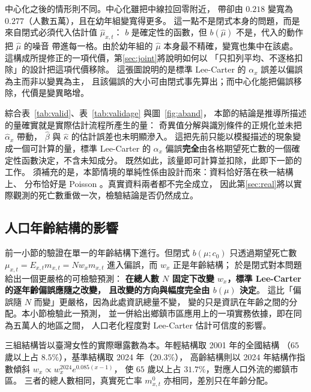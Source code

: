 \documentclass[UTF8, fontset=macnew, a4paper, 12pt]{ctexart}
\begin{document}
中心化之後的情形則不同。中心化雖把中線拉回零附近，
帶卻由 $0.218$ 變寬為 $0.277$（人數五萬），且在幼年組變寬得更多。
這一點不是閉式本身的問題，而是來自閉式必須代入估計值 $\hat\mu_{x,t}$：
$b$ 是確定性的函數，但 $b(\hat\mu)$ 不是，代入的動作把 $\hat\mu$ 的噪音
帶進每一格。由於幼年組的 $\hat\mu$ 本身最不精確，變寬也集中在該處。
這構成所提修正的一項代價，第\ref{sec:joint}將說明如何以
「只扣列平均、不逐格扣除」的設計把這項代價移除。
這張圖說明的是標準 Lee-Carter 的 $\alpha_x$ 誤差以偏誤為主而非以變異為主，
且該偏誤的大小可由閉式事先算出；而中心化能把偏誤移除，代價是變異略增。

綜合表~\ref{tab:valid}、表~\ref{tab:validage} 與圖~\ref{fig:aband}，
本節的結論是推導所描述的量確實就是實際估計流程所產生的量：
奇異值分解與識別條件的正規化並未把 $\hat\alpha_x$ 帶動，
$\hat\beta$ 與 $\hat\kappa$ 的估計誤差也未明顯滲入。
這把先前只能以模擬描述的現象變成一個可計算的量，標準 Lee-Carter 的 $\alpha_x$
偏誤\textbf{完全}由各格期望死亡數的一個確定性函數決定，不含未知成分。
既然如此，該量即可計算並扣除，此即下一節的工作。
須補充的是，本節情境的單純性係由設計而來：資料恰好落在秩一結構上、
分布恰好是 Poisson 。真實資料兩者都不完全成立，
因此第\ref{sec:real}將以實際觀測的死亡數重做一次，檢驗結論是否仍然成立。

\subsection{人口年齡結構的影響}\label{sec:popstr}

前一小節的驗證在單一的年齡結構下進行。但閉式 $b(\mu;c_0)$ 只透過期望死亡數
$\mu_{x,t}=E_{x,t}m_{x,t}=N w_x m_{x,t}$ 進入偏誤，而 $w_x$ 正是年齡結構；
於是閉式對本問題給出一個更嚴格的可檢驗預測：
\textbf{在總人數 $N$ 固定下改變 $w_x$，標準 Lee-Carter 的逐年齡偏誤應隨之改變，
且改變的方向與幅度完全由 $b(\mu)$ 決定}。
這比「偏誤隨 $N$ 而變」更嚴格，因為此處資訊總量不變，
變的只是資訊在年齡之間的分配。本小節檢驗此一預測，
並一併給出鄉鎮市區應用上的一項實務依據，即在同為五萬人的地區之間，
人口老化程度對 Lee-Carter 估計可信度的影響。

三組結構皆以臺灣女性的實際曝露數為本。年輕結構取 2001 年的全國結構
（$65$ 歲以上占 $8.5\%$），基準結構取 2024 年（$20.3\%$），
高齡結構則以 2024 年結構作指數傾斜 $w_x\propto w_x^{2024}e^{0.085(x-1)}$，
使 $65$ 歲以上占 $31.7\%$，對應人口外流的鄉鎮市區。
三者的總人數相同，真實死亡率 $m^{0}_{x,t}$ 亦相同，差別只在年齡分配。
\end{document}
